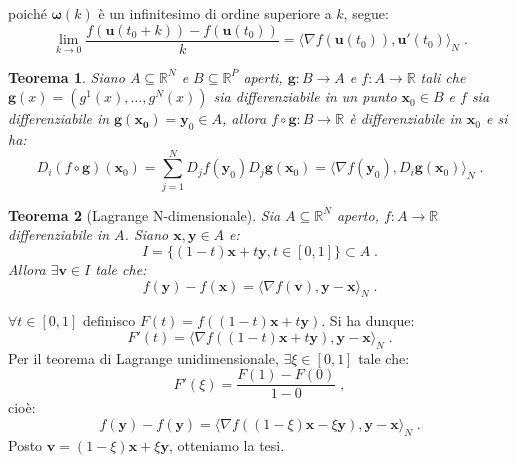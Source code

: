 \documentclass[a4paper,12pt]{report}
\theoremstyle{plain}
\newtheorem{thm}{Teorema}[section]
\theoremstyle{definition}
\theoremstyle{remark}
\numberwithin{equation}{section}
\begin{document}
poiché $\mathbf{\omega}(k)$ è un infinitesimo di ordine superiore a $k$, segue:
\begin{equation}
\lim_{k\to 0}\frac{f(\mathbf{u}(t_0+k))-f(\mathbf{u}(t_0))}{k}=\langle\nabla f(\mathbf{u}(t_0)),\mathbf{u}'(t_0)\rangle_N\;.
\end{equation}
\endproof
\begin{thm} Siano $A \subseteq \mathbb{R}^N$ e $B \subseteq \mathbb{R}^P$ aperti, $\mathbf{g}:B \to A$ e $f:A \to \mathbb{R}$ tali che $\mathbf{g}(x)=(g^1(x),\ldots,g^N(x))$ sia differenziabile in un punto $\mathbf{x}_0 \in B$ e $f$ sia differenziabile in $\mathbf{g}(\mathbf{x_0})=\mathbf{y}_0 \in A$, allora $f \circ \mathbf{g}: B \to \mathbb{R}$ è differenziabile in $\mathbf{x}_0$ e si ha:
\begin{equation}
D_i (f \circ \mathbf{g})(\mathbf{x}_0)=\sum_{j=1}^N D_j f(\mathbf{y}_0) D_j \mathbf{g}(\mathbf{x}_0)= \langle \nabla f(\mathbf{y}_0),
D_i \mathbf{g}(\mathbf{x}_0)\rangle_N\;.
\end{equation}
\end{thm}
\begin{thm}[Lagrange N-dimensionale] Sia $A \subseteq \mathbb{R}^N$ aperto, $f:A \to \mathbb{R}$ differenziabile in $A$. Siano $\mathbf{x},\mathbf{y} \in A$ e:
\begin{equation}
I=\{ (1-t)\mathbf{x}+t\mathbf{y}, t \in [0,1]\} \subset A\;.
\end{equation}
Allora $\exists \mathbf{v} \in I$ tale che:
\begin{equation}
f(\mathbf{y})-f(\mathbf{x})=\langle \nabla f(\mathbf{v}),\mathbf{y}-\mathbf{x}\rangle_N\;.
\end{equation}
\end{thm}
\proof $\forall t \in [0,1]$ definisco $F(t)=f((1-t)\mathbf{x}+t\mathbf{y})$. Si ha dunque:
\begin{equation}
F'(t)=\langle \nabla f((1-t)\mathbf{x}+t\mathbf{y}),\mathbf{y}-\mathbf{x}\rangle_N\;.
\end{equation}
Per il teorema di Lagrange unidimensionale, $\exists \xi \in [0,1]$ tale che:
\begin{equation}
F'(\xi)=\frac{F(1)-F(0)}{1-0}\;,
\end{equation}
cioè:
\begin{equation}
f(\mathbf{y})-f(\mathbf{y})=\langle \nabla f((1-\xi)\mathbf{x}-\xi \mathbf{y}),\mathbf{y}-\mathbf{x}\rangle_N\;.
\end{equation}
Posto $\mathbf{v}=(1-\xi)\mathbf{x}+\xi \mathbf{y}$, otteniamo la tesi.
\endproof
\end{document}
